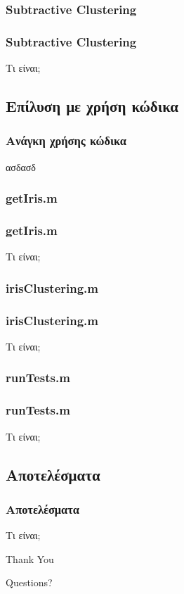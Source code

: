\documentclass[xetex,serif,mathserif,14pt]{beamer}
\begin{document}
\subsubsection{Subtractive Clustering}
\begin{frame}
\frametitle{Subtractive Clustering}
Τι είναι;
\end{frame}

\subsection{Επίλυση με χρήση κώδικα}

\begin{frame}
\frametitle{Ανάγκη χρήσης κώδικα}
ασδασδ
\end{frame}

\subsubsection{getIris.m}
\begin{frame}
\frametitle{getIris.m}
Τι είναι;
\end{frame}


\subsubsection{irisClustering.m}
\begin{frame}
\frametitle{irisClustering.m}
Τι είναι;
\end{frame}

\subsubsection{runTests.m}
\begin{frame}
\frametitle{runTests.m}
Τι είναι;
\end{frame}

\subsection{Αποτελέσματα}
\begin{frame}
\frametitle{Αποτελέσματα}
Τι είναι;
\end{frame}



\begin{frame}

\Huge{\centerline{Thank You}}
\Large{\centerline{Questions?}}
\end{frame}
\end{document}

